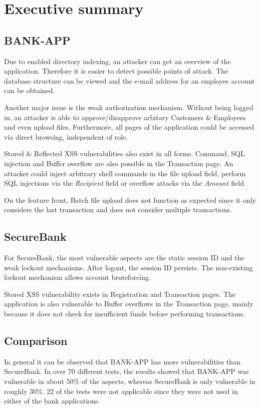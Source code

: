 \chapter{Executive summary}
\section*{BANK-APP}
Due to enabled directory indexing, an attacker can get an overview of the application. Therefore it is easier to detect possible points of attack. The database structure can be viewed and the e-mail address for an employee account can be obtained.

Another major issue is the weak authorization mechanism. Without being logged in, an attacker is able to approve/disapprove arbitary Customers \& Employees and even upload files. Furthermore, all pages of the application could be accessed via direct browsing, independent of role.

Stored \& Reflected XSS vulnerabilities also exist in all forms. Command, SQL injection and Buffer overflow are also possible in the Transaction page. An attacker could inject arbitrary shell commands in the file upload field, perform SQL injections via the \emph{Recipient} field or overflow attacks via the \emph{Amount} field.

On the feature front, Batch file upload does not function as expected since it only considers the last transaction and does not consider multiple transactions.

\section*{SecureBank}
For SecureBank, the most vulnerable aspects are the static session ID and the weak lockout mechanisms. After logout, the session ID persists. The non-existing lockout mechanism allows account bruteforcing.

Stored XSS vulnerability exists in Registration and Transaction pages. The application is also vulnerable to Buffer overflows in the Transaction page, mainly because it does not check for insufficient funds before performing transactions.

\section*{Comparison}
In general it can be observed that BANK-APP has more vulnerabilities than SecureBank. In over 70 different tests, the results showed that BANK-APP was vulnerable in about 50\% of the aspects, whereas SecureBank is only vulnerable in roughly 30\%. 22 of the tests were not applicable since they were not used in either of the bank applications.